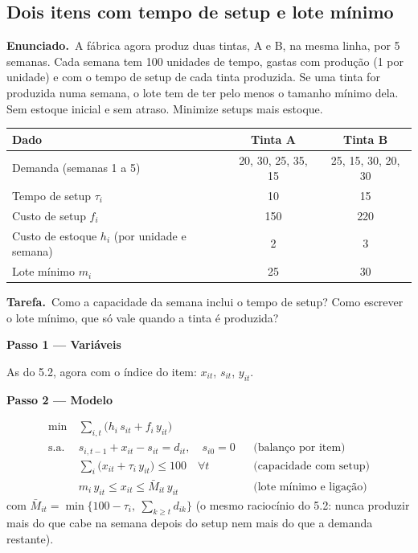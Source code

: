 \documentclass[11pt,a4paper]{article}
\newcommand{\enunciado}{\par\textbf{Enunciado.}\ }
\newcommand{\tarefa}{\par\textbf{Tarefa.}\ }
\newcommand{\passo}[1]{\par\medskip\textbf{#1}\par}
\begin{document}
\subsection{Dois itens com tempo de setup e lote mínimo}
\enunciado A fábrica agora produz duas tintas, A e B, na mesma linha, por 5 semanas. Cada semana tem 100 unidades de tempo,
gastas com produção (1 por unidade) e com o tempo de setup de cada tinta produzida. Se uma tinta for produzida numa semana,
o lote tem de ter pelo menos o tamanho mínimo dela. Sem estoque inicial e sem atraso. Minimize setups mais estoque.
\begin{center}
\begin{tabular}{lcc}
\toprule
Dado & Tinta A & Tinta B\\
\midrule
Demanda (semanas 1 a 5) & 20, 30, 25, 35, 15 & 25, 15, 30, 20, 30\\
Tempo de setup $\tau_i$ & 10 & 15\\
Custo de setup $f_i$ & 150 & 220\\
Custo de estoque $h_i$ (por unidade e semana) & 2 & 3\\
Lote mínimo $m_i$ & 25 & 30\\
\bottomrule
\end{tabular}
\end{center}
\tarefa Como a capacidade da semana inclui o tempo de setup? Como escrever o lote mínimo, que só vale quando a tinta é
produzida?

\passo{Passo 1 --- Variáveis}
As do 5.2, agora com o índice do item: $x_{it}$, $s_{it}$, $y_{it}$.

\passo{Passo 2 --- Modelo}
\begin{align*}
  \min\ & \sum_{i,t}\bigl(h_i\,s_{it} + f_i\,y_{it}\bigr)\\
  \text{s.a.}\ & s_{i,t-1} + x_{it} - s_{it} = d_{it}, \quad s_{i0}=0 && \text{(balanço por item)}\\
  & \sum_i \bigl(x_{it} + \tau_i\,y_{it}\bigr) \le 100 \quad\forall t && \text{(capacidade com setup)}\\
  & m_i\,y_{it} \le x_{it} \le \bar M_{it}\,y_{it} && \text{(lote mínimo e ligação)}
\end{align*}
com $\bar M_{it} = \min\{100-\tau_i,\ \sum_{k\ge t} d_{ik}\}$ (o mesmo raciocínio do 5.2: nunca produzir mais do que cabe na
semana depois do setup nem mais do que a demanda restante).
\end{document}
